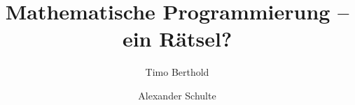 \documentclass[envcountsame,envcountchap,deutsch]{svmono}
\begin{document}
\author{Timo Berthold \and Alexander Schulte}
\title{Mathematische Programmierung -- ein Rätsel?}
\maketitle

\frontmatter%

%
%

\tableofcontents


\mainmatter%






%
%

\backmatter%
%
%
\printindex

\end{document}
